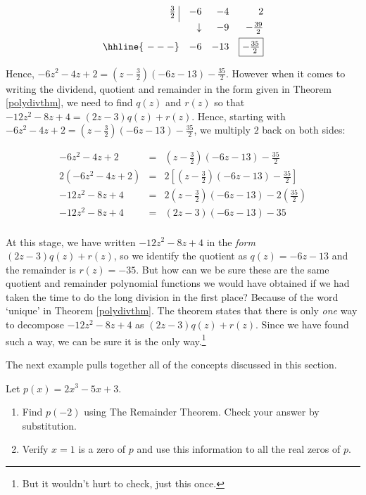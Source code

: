 \begin{exampleSol}
\begin{enumerate}
\[ \begin{array}{rrrr}


  \frac{3}{2} \, \, \vline& -6 & -4 & 2   \\ [4pt]

   & \downarrow &  -9  & -\frac{39}{2}  \\ [4pt] \hhline{~---} 
  &  -6  &   -13  & \fbox{$-\frac{35}{2}$}  \\  
\end{array}\]


Hence,  $-6z^2-4z+2 = \left(z-\frac{3}{2}\right)(-6 z - 13) - \frac{35}{2}$.  However when it comes to writing  the dividend, quotient and remainder in the form given in Theorem \ref{polydivthm}, we need to find $q(z)$ and $r(z)$ so that  $-12z^2-8z+4 = (2z-3) q(z) + r(z)$. Hence, starting with $-6z^2-4z+2 = \left(z-\frac{3}{2}\right)(-6 z - 13) - \frac{35}{2}$, we multiply $2$ back on both sides:  

\[ \begin{array}{rcl}
 -6z^2-4z+2  & = & \left(z-\frac{3}{2}\right)(-6 z - 13) - \frac{35}{2}\\
 2\left(-6z^2-4z+2 \right) & = & 2 \left[ \left(z-\frac{3}{2}\right)(-6 z - 13) - \frac{35}{2} \right] \\
 -12z^2-8z+4 & = & 2 \left(z-\frac{3}{2}\right)(-6 z - 13) - 2 \left(\frac{35}{2} \right) \\
 -12z^2-8z+4 & = & (2z-3) (-6 z - 13) - 35  \\ \end{array} \]

 At this stage, we have written $-12z^2-8z+4$ in the \emph{form} $(2z-3) q(z) + r(z)$, so we identify the quotient as  $q(z) = -6z-13$ and the remainder is $r(z) = -35$.  But how can we be sure these are the same quotient and remainder polynomial functions we would have obtained if we had taken the time to do the long division in the first place?   Because of the word   `unique' in Theorem \ref{polydivthm}.  The theorem states that there is only \textit{one} way to decompose $-12z^2-8z+4$ as $(2z-3)q(z) + r(z)$.  Since we have found such a way, we can be sure it is the only way.\footnote{But it wouldn't hurt to check, just this once.}
\end{enumerate}

\end{exampleSol}

The next example pulls together all of the concepts discussed in this section.  

\begin{example} Let $p(x) = 2x^3-5x+3$.

\begin{enumerate}

\item  Find $p(-2)$ using The Remainder Theorem.  Check your answer by substitution.

\item  Verify  $x=1$ is a zero of $p$ and use this information to all the real zeros of $p$.

\end{enumerate}

\end{example}

